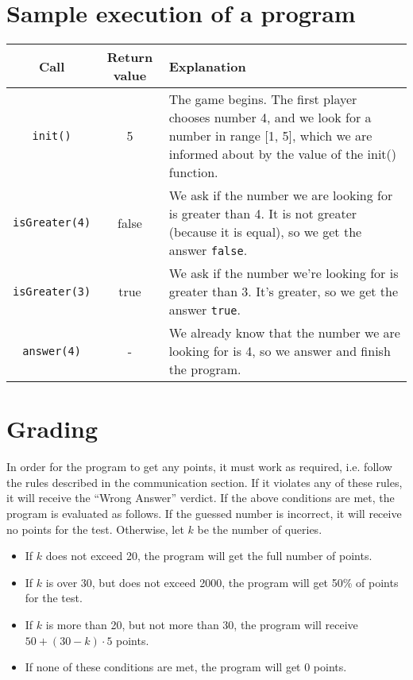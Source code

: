 \documentclass[en]{spiral}
\begin{document}
\section{Sample execution of a program}

    \begin{tabular}{|c|c|p{12.5cm}|}
        \hline

        \textbf{Call} & \textbf{Return value} & \textbf{Explanation} \\ \hline

        \texttt{init()} & 5 &
        The game begins. The first player chooses number 4,
        and we look for a number in range [1, 5],
        which we are informed about by the value of the init() function.
        \\ \hline

        \texttt{isGreater(4)} & false &
        We ask if the number we are looking for is greater than 4.
        It is not greater (because it is equal),
        so we get the answer \texttt{false}.  
        \\ \hline

        \texttt{isGreater(3)} & true &
        We ask if the number we're looking for is greater than 3.
        It's greater, so we get the answer \texttt{true}.  
        \\ \hline

        \texttt{answer(4)} & - &
        We already know that the number we are looking for is 4,
        so we answer and finish the program.
        \\ \hline
    \end{tabular}



    \section{Grading}

    In order for the program to get any points, it must work as required,
    i.e. follow the rules described in the communication section.
    If it violates any of these rules, it will receive the ``Wrong Answer'' verdict.
    If the above conditions are met, the program is evaluated as follows.
    If the guessed number is incorrect, it will receive no points for the test.
    Otherwise, let $k$ be the number of queries.
    \begin{itemize}
        \item If $k$ does not exceed 20, the program will get
            the full number of points.
        \item If $k$ is over 30, but does not exceed 2000, the program will get
            50\% of points for the test.
        \item If $k$ is more than 20, but not more than 30,
            the program will receive $50 + (30 - k) \cdot 5$ points.
        \item If none of these conditions are met, the program will get 0 points.
    \end{itemize}
\end{document}
